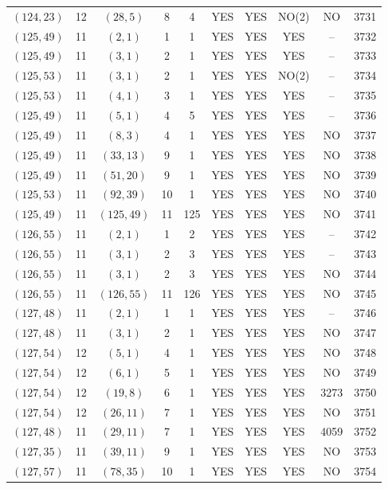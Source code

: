 \begin{longtable}{|c|c|c|c|c|c|c|c|c|c|}
$(124, 23)$ & 12 & $(28, 5)$ & 8 & 4 & YES & YES & NO(2) & NO & 3731\\
$(125, 49)$ & 11 & $(2, 1)$ & 1 & 1 & YES & YES & YES & -- & 3732\\
$(125, 49)$ & 11 & $(3, 1)$ & 2 & 1 & YES & YES & YES & -- & 3733\\
$(125, 53)$ & 11 & $(3, 1)$ & 2 & 1 & YES & YES & NO(2) & -- & 3734\\
$(125, 53)$ & 11 & $(4, 1)$ & 3 & 1 & YES & YES & YES & -- & 3735\\
$(125, 49)$ & 11 & $(5, 1)$ & 4 & 5 & YES & YES & YES & -- & 3736\\
$(125, 49)$ & 11 & $(8, 3)$ & 4 & 1 & YES & YES & YES & NO & 3737\\
$(125, 49)$ & 11 & $(33, 13)$ & 9 & 1 & YES & YES & YES & NO & 3738\\
$(125, 49)$ & 11 & $(51, 20)$ & 9 & 1 & YES & YES & YES & NO & 3739\\
$(125, 53)$ & 11 & $(92, 39)$ & 10 & 1 & YES & YES & YES & NO & 3740\\
$(125, 49)$ & 11 & $(125, 49)$ & 11 & 125 & YES & YES & YES & NO & 3741\\
$(126, 55)$ & 11 & $(2, 1)$ & 1 & 2 & YES & YES & YES & -- & 3742\\
$(126, 55)$ & 11 & $(3, 1)$ & 2 & 3 & YES & YES & YES & -- & 3743\\
$(126, 55)$ & 11 & $(3, 1)$ & 2 & 3 & YES & YES & YES & NO & 3744\\
$(126, 55)$ & 11 & $(126, 55)$ & 11 & 126 & YES & YES & YES & NO & 3745\\
$(127, 48)$ & 11 & $(2, 1)$ & 1 & 1 & YES & YES & YES & -- & 3746\\
$(127, 48)$ & 11 & $(3, 1)$ & 2 & 1 & YES & YES & YES & NO & 3747\\
$(127, 54)$ & 12 & $(5, 1)$ & 4 & 1 & YES & YES & YES & NO & 3748\\
$(127, 54)$ & 12 & $(6, 1)$ & 5 & 1 & YES & YES & YES & NO & 3749\\
$(127, 54)$ & 12 & $(19, 8)$ & 6 & 1 & YES & YES & YES & 3273 & 3750\\
$(127, 54)$ & 12 & $(26, 11)$ & 7 & 1 & YES & YES & YES & NO & 3751\\
$(127, 48)$ & 11 & $(29, 11)$ & 7 & 1 & YES & YES & YES & 4059 & 3752\\
$(127, 35)$ & 11 & $(39, 11)$ & 9 & 1 & YES & YES & YES & NO & 3753\\
$(127, 57)$ & 11 & $(78, 35)$ & 10 & 1 & YES & YES & YES & NO & 3754\\

\end{longtable}
